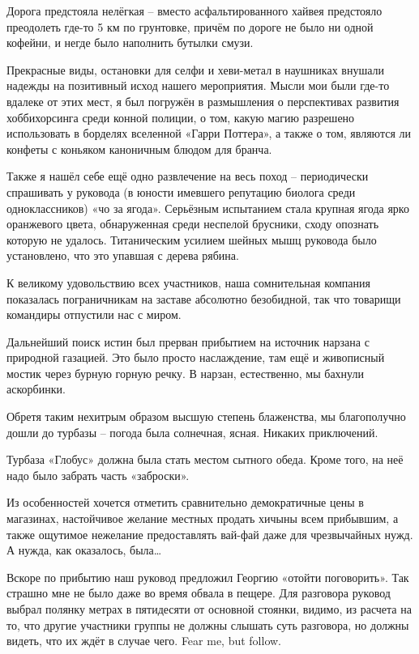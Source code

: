 Дорога предстояла нелёгкая – вместо асфальтированного хайвея предстояло преодолеть где-то 5 км по грунтовке, причём по дороге не было ни одной кофейни, и негде было наполнить бутылки смузи.

Прекрасные виды, остановки для селфи и хеви-метал в наушниках внушали надежды на позитивный исход нашего мероприятия. Мысли мои были где-то вдалеке от этих мест, я был погружён в размышления о перспективах развития хоббихорсинга среди конной полиции, о том, какую магию разрешено использовать в борделях вселенной «Гарри Поттера», а также о том, являются ли конфеты с коньяком каноничным блюдом для бранча.

Также я нашёл себе ещё одно развлечение на весь поход – периодически спрашивать у руковода (в юности имевшего репутацию биолога среди одноклассников) «чо за ягода». Серьёзным испытанием стала крупная ягода ярко оранжевого цвета, обнаруженная среди неспелой брусники, сходу опознать которую не удалось. Титаническим усилием шейных мышц руковода было установлено, что это упавшая с дерева рябина.

К великому удовольствию всех участников, наша сомнительная компания показалась пограничникам на заставе абсолютно безобидной, так что товарищи командиры отпустили нас с миром. 

Дальнейший поиск истин был прерван прибытием на источник нарзана с природной газацией. Это было просто наслаждение, там ещё и живописный мостик через бурную горную речку. В нарзан, естественно, мы бахнули аскорбинки.

Обретя таким нехитрым образом высшую степень блаженства, мы благополучно дошли до турбазы – погода была солнечная, ясная. Никаких приключений.

Турбаза «Глобус» должна была стать местом сытного обеда. Кроме того, на неё надо было забрать часть «заброски». 

Из особенностей хочется отметить сравнительно демократичные цены в магазинах, настойчивое желание местных продать хичыны всем прибывшим, а также ощутимое нежелание предоставлять вай-фай даже для чрезвычайных нужд. А нужда, как оказалось, была…

Вскоре по прибытию наш руковод предложил Георгию «отойти поговорить». Так страшно мне не было даже во время обвала в пещере. Для разговора руковод выбрал полянку метрах в пятидесяти от основной стоянки, видимо, из расчета на то, что другие участники группы не должны слышать суть разговора, но должны видеть, что их ждёт в случае чего. Fear me, but follow.

